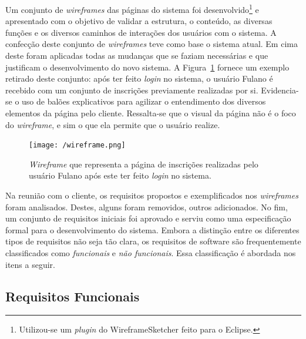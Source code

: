\documentclass[
  10.5pt,				  %
	openright,			%
	twoside,			  %
  a5paper,
  chapter=TITLE,	%
	section=TITLE,	%
  hyphens,        %
	english,        %
	brazil          %
]{abntex2}
\begin{document}
Um conjunto de \emph{wireframes} das páginas do sistema foi desenvolvido\footnote{Utilizou-se um \emph{plugin} do WireframeSketcher feito para o Eclipse.} e apresentado com o objetivo de validar a estrutura, o conteúdo, as diversas funções e os diversos caminhos de interações dos usuários com o sistema. A confecção deste conjunto de \emph{wireframes} teve como base o sistema atual. Em cima deste foram aplicadas todas as mudanças que se faziam necessárias e que justificam o desenvolvimento do novo sistema. A Figura~\ref{fig:wireframe} fornece um exemplo retirado deste conjunto: após ter feito \emph{login} no sistema, o usuário Fulano é recebido com um conjunto de inscrições previamente realizadas por si. Evidencia-se o uso de balões explicativos para agilizar o entendimento dos diversos elementos da página pelo cliente. Ressalta-se que o visual da página não é o foco do \emph{wireframe}, e sim o que ela permite que o usuário realize.

\begin{figure}[!ht]
  \caption{\label{fig:wireframe} \emph{Wireframe} que representa a página de inscrições realizadas pelo usuário Fulano após este ter feito \emph{login} no sistema. }
  \begin{center}
    \texttt{[image: /wireframe.png]}
  \end{center}
\end{figure}

Na reunião com o cliente, os requisitos propostos e exemplificados nos \emph{wireframes} foram analisados. Destes, alguns foram removidos, outros adicionados. No fim, um conjunto de requisitos iniciais
 foi aprovado e serviu como uma especificação formal para o desenvolvimento do sistema. Embora a distinção entre os diferentes tipos de requisitos não seja tão clara, os requisitos de software são frequentemente classificados como \emph{funcionais} e \emph{não funcionais}. Essa classificação é abordada nos itens a seguir.

\subsection{Requisitos Funcionais}\label{sec:requisitos_funcionais}
\end{document}
